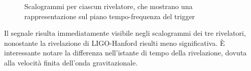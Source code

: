 \begin{figure}[ht]
	\vspace{-10pt}
	\centering
	\vspace{-8pt}
	\caption{Scalogrammi per ciascun rivelatore, che mostrano una rappresentazione sul piano tempo-frequenza del trigger}
	\label{fig:spettrogramma_apr4}
	\vspace{-10pt}
\end{figure}
Il segnale risulta immediatamente visibile negli scalogrammi dei tre rivelatori, nonostante la rivelazione di LIGO-Hanford risulti meno significativa. È interessante notare la differenza nell'istante di tempo della rivelazione, dovuta alla velocità finita dell'onda gravitazionale.

